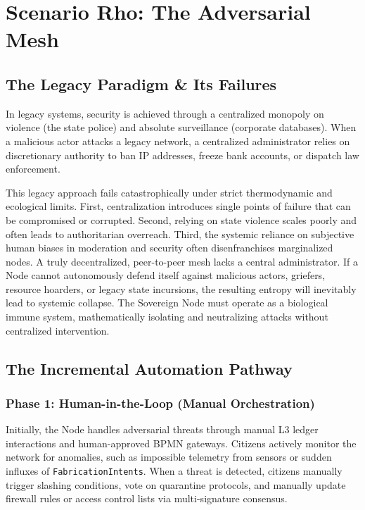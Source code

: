 \chapter{Scenario Rho: The Adversarial Mesh}
\label{ch:scenario_rho}

\section{The Legacy Paradigm \& Its Failures}
In legacy systems, security is achieved through a centralized monopoly on violence (the state police) and absolute surveillance (corporate databases). When a malicious actor attacks a legacy network, a centralized administrator relies on discretionary authority to ban IP addresses, freeze bank accounts, or dispatch law enforcement. 

This legacy approach fails catastrophically under strict thermodynamic and ecological limits. First, centralization introduces single points of failure that can be compromised or corrupted. Second, relying on state violence scales poorly and often leads to authoritarian overreach. Third, the systemic reliance on subjective human biases in moderation and security often disenfranchises marginalized nodes. A truly decentralized, peer-to-peer mesh lacks a central administrator. If a Node cannot autonomously defend itself against malicious actors, griefers, resource hoarders, or legacy state incursions, the resulting entropy will inevitably lead to systemic collapse. The Sovereign Node must operate as a biological immune system, mathematically isolating and neutralizing attacks without centralized intervention.

\section{The Incremental Automation Pathway}

\subsection{Phase 1: Human-in-the-Loop (Manual Orchestration)}
Initially, the Node handles adversarial threats through manual L3 ledger interactions and human-approved BPMN gateways. Citizens actively monitor the network for anomalies, such as impossible telemetry from sensors or sudden influxes of \texttt{FabricationIntents}. When a threat is detected, citizens manually trigger slashing conditions, vote on quarantine protocols, and manually update firewall rules or access control lists via multi-signature consensus.


